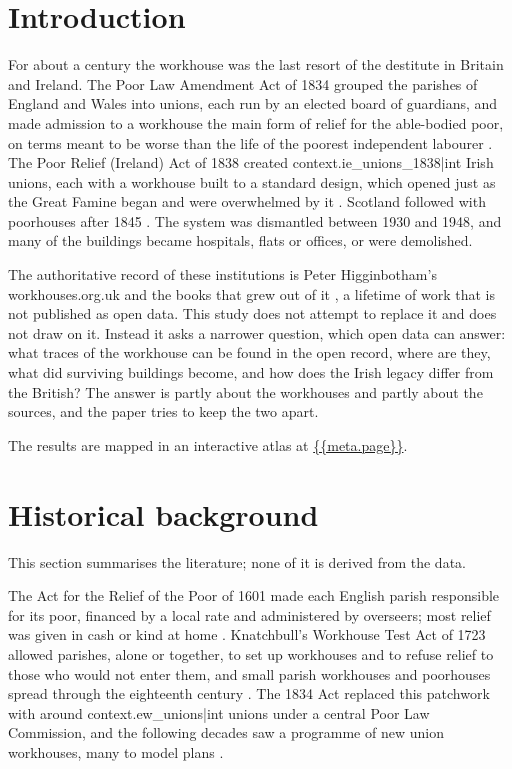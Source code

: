\documentclass[11pt,a4paper]{article}
\begin{document}
\section{Introduction}
For about a century the workhouse was the last resort of the destitute in Britain and Ireland. The Poor Law Amendment Act of 1834 grouped the parishes of England and Wales into unions, each run by an elected board of guardians, and made admission to a workhouse the main form of relief for the able-bodied poor, on terms meant to be worse than the life of the poorest independent labourer \citep{crowther,morrison}. The Poor Relief (Ireland) Act of 1838 created {{context.ie_unions_1838|int}} Irish unions, each with a workhouse built to a standard design, which opened just as the Great Famine began and were overwhelmed by it \citep{oconnor,kinealy}. Scotland followed with poorhouses after 1845 \citep{higginbotham}. The system was dismantled between 1930 and 1948, and many of the buildings became hospitals, flats or offices, or were demolished.

The authoritative record of these institutions is Peter Higginbotham's workhouses.org.uk and the books that grew out of it \citep{higginbotham}, a lifetime of work that is not published as open data. This study does not attempt to replace it and does not draw on it. Instead it asks a narrower question, which open data can answer: what traces of the workhouse can be found in the open record, where are they, what did surviving buildings become, and how does the Irish legacy differ from the British? The answer is partly about the workhouses and partly about the sources, and the paper tries to keep the two apart.

The results are mapped in an interactive atlas at \url{{{meta.page}}}.

\section{Historical background}
This section summarises the literature; none of it is derived from the data.

The Act for the Relief of the Poor of 1601 made each English parish responsible for its poor, financed by a local rate and administered by overseers; most relief was given in cash or kind at home \citep{slack}. Knatchbull's Workhouse Test Act of 1723 allowed parishes, alone or together, to set up workhouses and to refuse relief to those who would not enter them, and small parish workhouses and poorhouses spread through the eighteenth century \citep{slack,higginbotham}. The 1834 Act replaced this patchwork with around {{context.ew_unions|int}} unions under a central Poor Law Commission, and the following decades saw a programme of new union workhouses, many to model plans \citep{crowther,morrison}.
\end{document}
